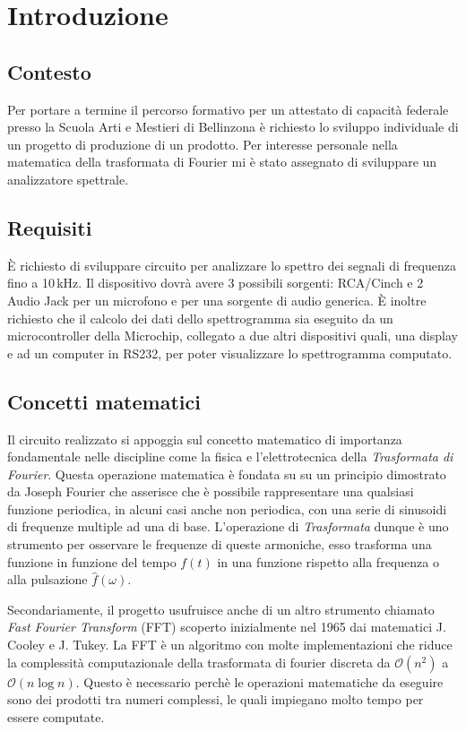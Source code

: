 \chapter{Introduzione}

\section{Contesto}
Per portare a termine il percorso formativo per un attestato di capacit\`a
federale presso la Scuola Arti e Mestieri di Bellinzona \`e richiesto lo
sviluppo individuale di un progetto di produzione di un prodotto.
Per interesse personale nella matematica della trasformata di Fourier mi \`e
stato assegnato di sviluppare un analizzatore spettrale.

\section{Requisiti}
\`E richiesto di sviluppare circuito per analizzare lo spettro dei segnali di
frequenza fino a 10\,kHz. Il dispositivo dovr\`a avere 3 possibili sorgenti:
RCA/Cinch e 2 Audio Jack per un microfono e per una sorgente di audio
generica. \`E inoltre richiesto che il calcolo dei dati dello spettrogramma
sia eseguito da un microcontroller della Microchip, collegato a due
altri dispositivi quali, una display e ad un computer in RS232, per poter
visualizzare lo spettrogramma computato.

\section{Concetti matematici}
Il circuito realizzato si appoggia sul concetto matematico di importanza
fondamentale nelle discipline come la fisica e l'elettrotecnica della
\emph{Trasformata di Fourier}. Questa operazione matematica \`e fondata su su
un principio dimostrato da Joseph Fourier che asserisce che \`e possibile
rappresentare una qualsiasi funzione periodica, in alcuni casi anche non
periodica, con una serie di sinusoidi di frequenze multiple ad una di base.
L'operazione di \emph{Trasformata} dunque \`e uno strumento per osservare
le frequenze di queste armoniche, esso trasforma una funzione in funzione del
tempo \(f(t)\) in una funzione rispetto alla frequenza o alla pulsazione
\(\hat f(\omega)\).

Secondariamente, il progetto usufruisce anche di un altro strumento chiamato
\emph{Fast Fourier Transform} (FFT) scoperto inizialmente nel 1965 dai
matematici J. Cooley e J. Tukey. La FFT \`e un algoritmo con molte
implementazioni che riduce la complessit\`a computazionale della trasformata
di fourier discreta da \(\mathcal{O}(n^2)\) a \(\mathcal{O}(n \log n)\).
Questo \`e necessario perch\`e le operazioni matematiche da eseguire sono dei
prodotti tra numeri complessi, le quali impiegano molto tempo per
essere computate.

